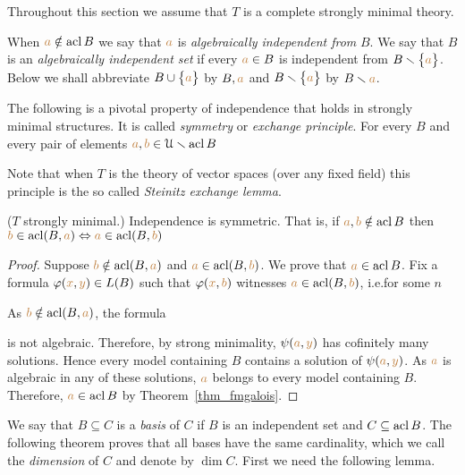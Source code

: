 Throughout this section we assume that $T$ is a complete strongly minimal theory.

When ${\color{brown} a}\notin\mathop{\rm acl} B$ we say that ${\color{brown} a}$ is \emph{algebraically independent from\/} $B$.
We say that $B$ is an \emph{algebraically independent set\/} if every ${\color{brown} a}\in B$ is independent from $B\smallsetminus\big\{{\color{brown} a}\big\}$.
Below we shall abbreviate $B\cup\big\{{\color{brown} a}\big\}$ by \emph{$B,{\color{brown} a}$} and  $B\smallsetminus\big\{{\color{brown} a}\big\}$ by \emph{$B\smallsetminus{\color{brown}a}$}.


The following is a pivotal property of independence that holds in strongly minimal structures.
It is called \emph{symmetry\/} or \emph{exchange principle}.
For every $B$ and every pair of elements ${\color{brown} a},{\color{brown} b}\in\EuScript U\smallsetminus\mathop{\rm acl} B$


Note that when $T$ is the theory of vector spaces (over any fixed field) this principle is the so called \emph{Steinitz exchange lemma}.

\begin{theorem} 
($T$ strongly minimal.) Independence is symmetric.
That is, if ${\color{brown} a},{\color{brown} b}\notin\mathop{\rm acl} B$ then ${\color{brown} b}\in\mathop{\rm acl} (B,{\color{brown} a})\Leftrightarrow{\color{brown}a}\in\mathop{\rm acl}(B,{\color{brown} b})$
\end{theorem} 

\begin{proof} 
Suppose ${\color{brown} b}\notin\mathop{\rm acl}(B,{\color{brown} a})$ and ${\color{brown} a}\in\mathop{\rm acl}(B,{\color{brown} b})$.
We prove that ${\color{brown} a}\in\mathop{\rm acl} B$.
Fix a formula $\varphi({\color{brown} x},{\color{brown} y})\in L(B)$ such that $\varphi({\color{brown} x},{\color{brown} b})$ witnesses ${\color{brown} a}\in\mathop{\rm acl}(B,{\color{brown} b})$, i.e.\@ for some $n$


As ${\color{brown} b}\notin\mathop{\rm acl}(B,{\color{brown} a})$, the formula


is not algebraic.
Therefore, by strong minimality, $\psi({\color{brown} a},{\color{brown} y})$ has cofinitely many solutions.
Hence every model containing $B$ contains a solution of $\psi({\color{brown} a},{\color{brown} y})$.
As ${\color{brown} a}$ is algebraic in any of these solutions, ${\color{brown} a}$ belongs to every model containing $B$.
Therefore, ${\color{brown} a}\in\mathop{\rm acl} B$ by Theorem~\ref{thm_fmgalois}.
\end{proof}

We say that $B\subseteq C$ is a \emph{basis\/} of $C$ if $B$ is an independent set and $C\subseteq\mathop{\rm acl} B$.
The following theorem proves that all bases have the same cardinality, which we call the  \emph{dimension\/} of $C$ and denote by \emph{$\dim C$}.
First we need the following lemma.

